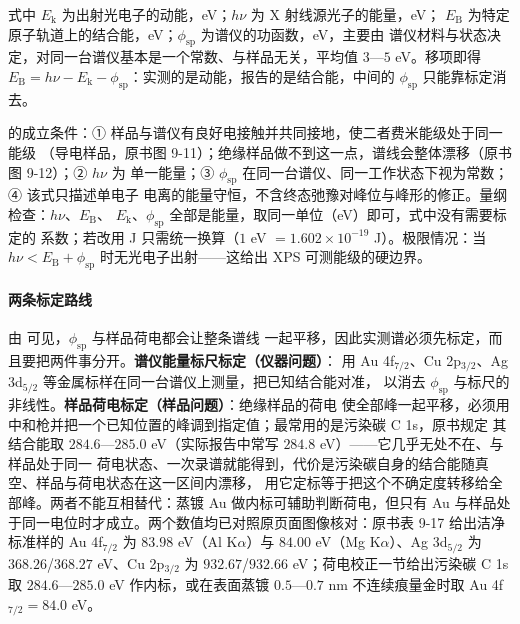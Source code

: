 式中 $E_{\mathrm{k}}$ 为出射光电子的动能，eV；$h\nu$ 为 X 射线源光子的能量，eV；
$E_{\mathrm{B}}$ 为特定原子轨道上的结合能，eV；$\phi_{\mathrm{sp}}$ 为谱仪的功函数，eV，主要由
谱仪材料与状态决定，对同一台谱仪基本是一个常数、与样品无关，平均值 $3$—$5$ eV。移项即得
$E_{\mathrm{B}}=h\nu-E_{\mathrm{k}}-\phi_{\mathrm{sp}}$：实测的是动能，报告的是结合能，中间的
$\phi_{\mathrm{sp}}$ 只能靠标定消去。

\begin{keycond}
 的成立条件：① 样品与谱仪有良好电接触并共同接地，使二者费米能级处于同一能级
（导电样品，原书图 9-11）；绝缘样品做不到这一点，谱线会整体漂移（原书图 9-12）；② $h\nu$ 为
单一能量；③ $\phi_{\mathrm{sp}}$ 在同一台谱仪、同一工作状态下视为常数；④ 该式只描述单电子
电离的能量守恒，不含终态弛豫对峰位与峰形的修正。量纲检查：$h\nu$、$E_{\mathrm{B}}$、
$E_{\mathrm{k}}$、$\phi_{\mathrm{sp}}$ 全部是能量，取同一单位（eV）即可，式中没有需要标定的
系数；若改用 J 只需统一换算（$1$ eV $=1.602\times10^{-19}$ J）。极限情况：当
$h\nu<E_{\mathrm{B}}+\phi_{\mathrm{sp}}$ 时无光电子出射——这给出 XPS 可测能级的硬边界。
\end{keycond}

\paragraph{两条标定路线}由  可见，$\phi_{\mathrm{sp}}$ 与样品荷电都会让整条谱线
一起平移，因此实测谱必须先标定，而且要把两件事分开。\textbf{谱仪能量标尺标定（仪器问题）}：
用 Au 4f$_{7/2}$、Cu 2p$_{3/2}$、Ag 3d$_{5/2}$ 等金属标样在同一台谱仪上测量，把已知结合能对准，
以消去 $\phi_{\mathrm{sp}}$ 与标尺的非线性。\textbf{样品荷电标定（样品问题）}：绝缘样品的荷电
使全部峰一起平移，必须用中和枪并把一个已知位置的峰调到指定值；最常用的是污染碳 C 1s，原书规定
其结合能取 $284.6$—$285.0$ eV（实际报告中常写 $284.8$ eV）——它几乎无处不在、与样品处于同一
荷电状态、一次录谱就能得到，代价是污染碳自身的结合能随真空、样品与荷电状态在这一区间内漂移，
用它定标等于把这个不确定度转移给全部峰。两者不能互相替代：蒸镀 Au 做内标可辅助判断荷电，但只有
Au 与样品处于同一电位时才成立。两个数值均已对照原页面图像核对：原书表 9-17 给出洁净标准样的
Au 4f$_{7/2}$ 为 $83.98$ eV（Al K$\alpha$）与 $84.00$ eV（Mg K$\alpha$）、Ag 3d$_{5/2}$ 为
$368.26$/$368.27$ eV、Cu 2p$_{3/2}$ 为 $932.67$/$932.66$ eV；荷电校正一节给出污染碳 C 1s 取
$284.6$—$285.0$ eV 作内标，或在表面蒸镀 $0.5$—$0.7$ nm 不连续痕量金时取 Au 4f$_{7/2}=84.0$ eV。

